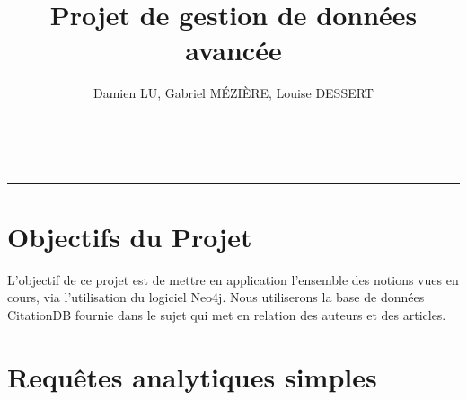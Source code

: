 \documentclass[11pt]{article}
\title{Projet de gestion de données avancée}
\author{Damien LU, Gabriel MÉZIÈRE, Louise DESSERT}
\begin{document}
  \maketitle
  \tableofcontents
~\\ \hrule

\section{Objectifs du Projet}

L'objectif de ce projet est de mettre en application l'ensemble des notions vues en cours, via l'utilisation du logiciel Neo4j. Nous utiliserons la base de données CitationDB fournie dans le sujet qui met en relation des auteurs et des articles.


\section{Requêtes analytiques simples}
\end{document}
